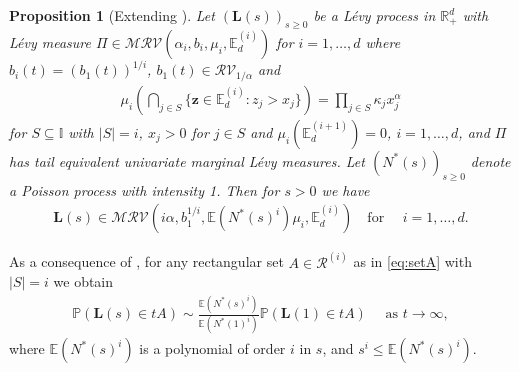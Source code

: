 \documentclass[aos]{imsart}
\numberwithin{equation}{section}
\theoremstyle{plain} %
\newtheorem{proposition}[theorem]{Proposition}
\theoremstyle{remark}
\newcommand{\beao}{\begin{eqnarray*}}
\newcommand{\eeao}{\end{eqnarray*}\noindent}
\newcommand{\E}{\mathbb{E}}
\renewcommand\P{\mathbb{P}}
\newcommand{\R}{\mathbb{R}}
\def\MRV{\mathcal{MRV}}
\def\RV{\mathcal{RV}}
\def\bL{\boldsymbol L}
\def\bz{\boldsymbol z}
\begin{document}
\begin{proposition}[Extending ] \label{Corollary:2}
Let $(\bL(s))_{s\geq 0}$ be a L\'evy process in $\R_+^d$ with L\'evy measure $\Pi\in\MRV(\alpha_i,b_i,\mu_i,\E_d^{(i)})$  for $i=1,\ldots,d$
where $b_i(t)=(b_1(t))^{1/i}$, $b_1(t)\in \RV_{1/\alpha}$ and
    \begin{eqnarray*}
            \mu_i\left(\bigcap_{j\in S}\{\bz\in \E_d^{(i)}:z_j>x_j\}\right)=\prod_{j\in S}\kappa_j x_j^{\alpha}
           \end{eqnarray*}
         for $S\subseteq \mathbb{I}$ with $|S|=i$, $x_j>0$ for $j\in S$   and $\mu_{i}(\E_d^{(i+1)})=0$, $i=1,\ldots, d$,
         and $\Pi$ has tail equivalent univariate marginal L\'evy measures. Let $(N^*(s))_{s\geq 0}$ denote a Poisson
         process with intensity 1.
         Then for $s>0$ we have
         \beao
                \bL(s)\in\MRV(i\alpha,b_1^{1/i},\E(N^*(s)^{i})\mu_i,\E_d^{(i)}) \quad  \text {for } \quad i=1,\ldots,d.
         \eeao
\end{proposition}
As a consequence of , for any rectangular set $A\in\mathcal{R}^{(i)}$ as in \eqref{eq:setA} with $|S|=i$
we obtain
\begin{eqnarray*}
    \P(\bL(s)\in tA)\sim \frac{\E(N^*(s)^{i})}{\E(N^*(1)^{i})}\P(\bL(1)\in tA) \quad \text{ as }t\to\infty,
\end{eqnarray*}
where $\E(N^*(s)^{i})$ is a polynomial of order $i$ in $s$, and $s^i\leq \E(N^*(s)^{i})$.
\end{document}
